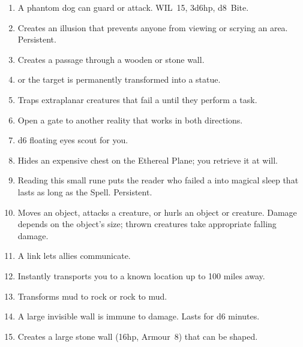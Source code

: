 \documentclass[itdr]{subfiles}
\begin{document}
\begin{enumerate}
	\item {} A phantom dog can guard or attack. WIL~15, 3d6hp, d8~Bite.
	\item {} Creates an illusion that prevents anyone from viewing or scrying an area. Persistent.
	\item {} Creates a passage through a wooden or stone wall.
	\item {}  or the target is permanently transformed into a statue.
	\item {} Traps extraplanar creatures that fail a  until they perform a task.
	\item {} Open a gate to another reality that works in both directions.
	\item {} d6 floating eyes scout for you.
	\item {} Hides an expensive chest on the Ethereal Plane; you retrieve it at will.
	\item {} Reading this small rune puts the reader who failed a  into magical sleep that lasts as long as the Spell. Persistent.
	\item {} Moves an object, attacks a creature, or hurls an object or creature. Damage \mbox{depends} on the object's size; thrown creatures take appropriate falling damage.
	\item {} A link lets allies communicate.
	\item {} Instantly transports you to a known location up to 100 miles away.
	\item {} Transforms mud to rock or rock to mud.
	\item {} A large invisible wall is immune to damage. Lasts for d6 minutes.
	\item {} Creates a large stone wall (16hp, Armour~8) that can be shaped.
\end{enumerate}

\vfill
\break
\end{document}
